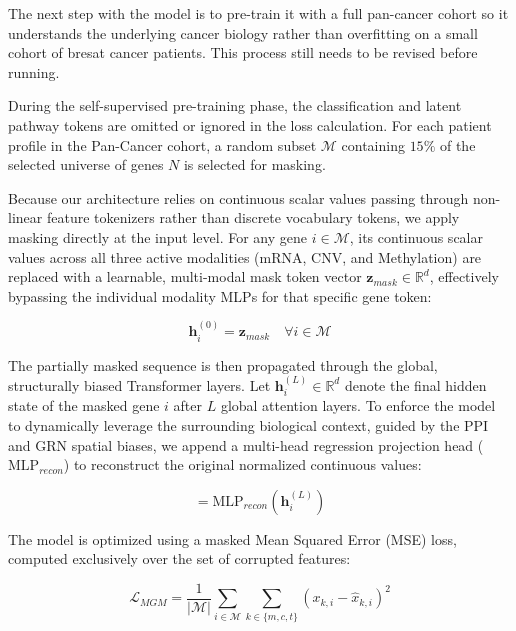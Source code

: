 \documentclass[10pt, twocolumn]{article}
\begin{document}
The next step with the model is to pre-train it with a full pan-cancer cohort so it understands the underlying cancer biology rather than overfitting on a small cohort of bresat cancer patients. This process still needs to be revised before running. 

During the self-supervised pre-training phase, the classification and latent pathway tokens are omitted or ignored in the loss calculation. For each patient profile in the Pan-Cancer cohort, a random subset $\mathcal{M}$ containing $15\%$ of the selected universe of genes $N$ is selected for masking. 

Because our architecture relies on continuous scalar values passing through non-linear feature tokenizers rather than discrete vocabulary tokens, we apply masking directly at the input level. For any gene $i \in \mathcal{M}$, its continuous scalar values across all three active modalities (mRNA, CNV, and Methylation) are replaced with a learnable, multi-modal mask token vector $\mathbf{z}_{mask} \in \mathbb{R}^d$, effectively bypassing the individual modality MLPs for that specific gene token:

\begin{equation}
    \mathbf{h}_i^{(0)} = \mathbf{z}_{mask} \quad \forall i \in \mathcal{M}
\end{equation}

The partially masked sequence is then propagated through the global, structurally biased Transformer layers. Let $\mathbf{h}_i^{(L)} \in \mathbb{R}^d$ denote the final hidden state of the masked gene $i$ after $L$ global attention layers. To enforce the model to dynamically leverage the surrounding biological context, guided by the PPI and GRN spatial biases, we append a multi-head regression projection head ($\text{MLP}_{recon}$) to reconstruct the original normalized continuous values:

\begin{equation}
    [\hat{x}_{m,i}, \hat{x}_{c,i}, \hat{x}_{t,i}] = \text{MLP}_{recon}\left(\mathbf{h}_i^{(L)}\right)
\end{equation}

The model is optimized using a masked Mean Squared Error (MSE) loss, computed exclusively over the set of corrupted features:

\begin{equation}
    \mathcal{L}_{MGM} = \frac{1}{|\mathcal{M}|} \sum_{i \in \mathcal{M}} \sum_{k \in \{m, c, t\}} \left( x_{k,i} - \hat{x}_{k,i} \right)^2
\end{equation}
\end{document}
